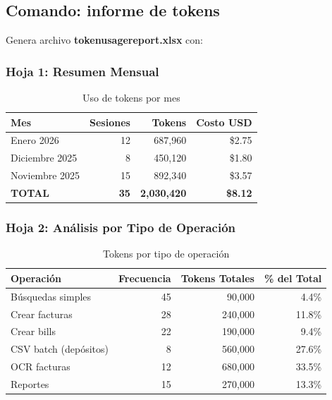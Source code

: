\documentclass[12pt,oneside]{article}
\begin{document}
\subsection{Comando: informe de tokens}

Genera archivo \textbf{tokenusagereport.xlsx} con:

\subsubsection{Hoja 1: Resumen Mensual}

\begin{table}[h]
\centering
\begin{tabular}{|l|r|r|r|}
\hline
\textbf{Mes} & \textbf{Sesiones} & \textbf{Tokens} & \textbf{Costo USD} \\
\hline
Enero 2026 & 12 & 687,960 & \$2.75 \\
Diciembre 2025 & 8 & 450,120 & \$1.80 \\
Noviembre 2025 & 15 & 892,340 & \$3.57 \\
\hline
\textbf{TOTAL} & \textbf{35} & \textbf{2,030,420} & \textbf{\$8.12} \\
\hline
\end{tabular}
\caption{Uso de tokens por mes}
\end{table}

\subsubsection{Hoja 2: Análisis por Tipo de Operación}

\begin{table}[h]
\centering
\begin{tabular}{|l|r|r|r|}
\hline
\textbf{Operación} & \textbf{Frecuencia} & \textbf{Tokens Totales} & \textbf{\% del Total} \\
\hline
Búsquedas simples & 45 & 90,000 & 4.4\% \\
Crear facturas & 28 & 240,000 & 11.8\% \\
Crear bills & 22 & 190,000 & 9.4\% \\
CSV batch (depósitos) & 8 & 560,000 & 27.6\% \\
OCR facturas & 12 & 680,000 & 33.5\% \\
Reportes & 15 & 270,000 & 13.3\% \\
\hline
\end{tabular}
\caption{Tokens por tipo de operación}
\end{table}
\end{document}
